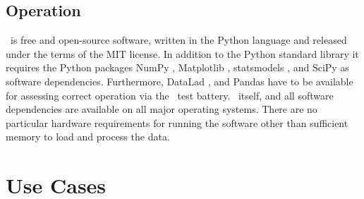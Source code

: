 
\subsection*{Operation}

\remodnav\ is free and open-source software, written in the Python language and
released under the terms of the MIT license. In addition to the Python standard
library it requires the Python packages
NumPy \citep{oliphant2006guide},
Matplotlib \citep{hunter2007matplotlib},
statsmodels \citep{seabold2010statsmodels},
and SciPy \citep{JOP+2001} as software dependencies.
Furthermore, DataLad \citep{HH+2013},
and Pandas \citep{mckinney2010data} have to be available for assessing
correct operation via the \remodnav\ test battery. \remodnav\ itself,
and all software dependencies are available on all major operating systems.
There are no particular hardware requirements for running the software
other than sufficient memory to load and process the data.



\section*{Use Cases} %

